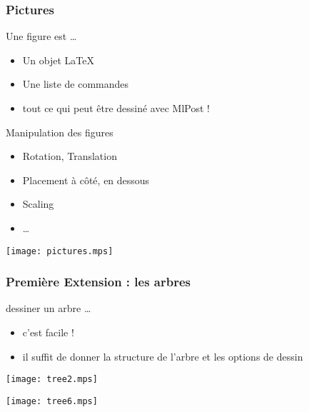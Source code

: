 \documentclass[nodefaultblocks]{beamer}
\begin{document}
\begin{frame}\frametitle{Pictures}

  \begin{block}{Une figure est \dots}
    \begin{itemize}
      \item Un objet \LaTeX
      \item Une liste de commandes
      \item tout ce qui peut être dessiné avec MlPost ! 
    \end{itemize}
  \end{block}

  \begin{minipage}[]{0.5\textwidth}
    \begin{block}{Manipulation des figures}
      \begin{itemize}
        \item Rotation, Translation
        \item Placement à côté, en dessous
        \item Scaling 
        \item \dots 
      \end{itemize}
    \end{block}
  \end{minipage}
  \begin{minipage}[]{0.4\textwidth}
    \begin{center}
      \texttt{[image: pictures.mps]}
    \end{center}
  \end{minipage}
\end{frame}

\begin{frame}\frametitle{Première Extension : les arbres}
  \begin{block}{dessiner un arbre \dots}
    \begin{itemize}
      \item c'est facile !
      \item il suffit de donner la structure de l'arbre et les options de
        dessin 
    \end{itemize}
  \end{block}
  \begin{minipage}[]{0.45\textwidth}
    \begin{center}
      \texttt{[image: tree2.mps]}
    \end{center}
  \end{minipage}
  \begin{minipage}[]{0.45\textwidth}
    \begin{center}
      \texttt{[image: tree6.mps]}
    \end{center}
  \end{minipage}
\end{frame}
\end{document}

